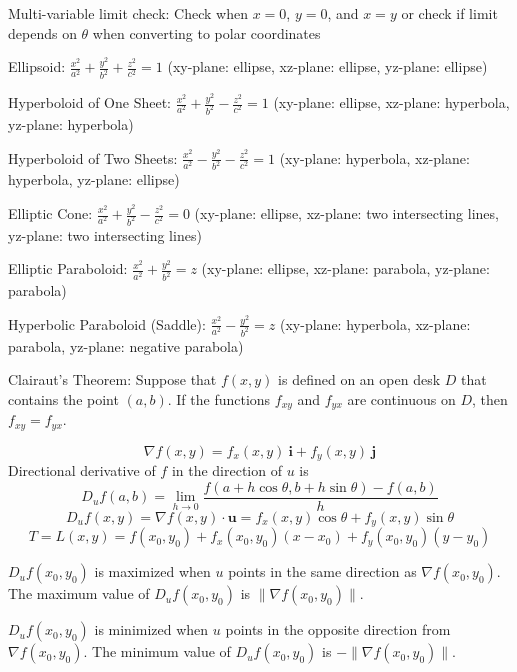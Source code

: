 \documentclass{article}
\begin{document}
Multi-variable limit check: Check when $x=0$, $y=0$, and $x=y$ or check if limit depends on $\theta$ when converting to polar coordinates
\vspace{1em}

Ellipsoid: $\frac{x^2}{a^2} + \frac{y^2}{b^2} + \frac{z^2}{c^2} = 1$ (xy-plane: ellipse, xz-plane: ellipse, yz-plane: ellipse)
\vspace{1em}

Hyperboloid of One Sheet: $\frac{x^2}{a^2} + \frac{y^2}{b^2} - \frac{z^2}{c^2} = 1$ (xy-plane: ellipse, xz-plane: hyperbola, yz-plane: hyperbola)
\vspace{1em}

Hyperboloid of Two Sheets: $\frac{x^2}{a^2} - \frac{y^2}{b^2} - \frac{z^2}{c^2} = 1$ (xy-plane: hyperbola, xz-plane: hyperbola, yz-plane: ellipse)
\vspace{1em}

Elliptic Cone: $\frac{x^2}{a^2} + \frac{y^2}{b^2} - \frac{z^2}{c^2} = 0$ (xy-plane: ellipse, xz-plane: two intersecting lines, yz-plane: two intersecting lines)
\vspace{1em}

Elliptic Paraboloid: $\frac{x^2}{a^2} + \frac{y^2}{b^2} = z$ (xy-plane: ellipse, xz-plane: parabola, yz-plane: parabola)
\vspace{1em}

Hyperbolic Paraboloid (Saddle): $\frac{x^2}{a^2} - \frac{y^2}{b^2} = z$ (xy-plane: hyperbola, xz-plane: parabola, yz-plane: negative parabola)
\vspace{1em}

Clairaut's Theorem: Suppose that $f(x, y)$ is defined on an open desk $D$ that contains the point $(a, b)$. If the functions $f_{xy}$ and $f_{yx}$ are continuous on $D$, then $f_{xy}=f_{yx}$.

\[\nabla f(x,y)=f_x(x,y)\:\mathbf{i}+f_y(x,y)\:\mathbf{j}\]
Directional derivative of $f$ in the direction of $u$ is
\[D_u f(a, b)=\lim_{h\rightarrow 0}\frac{f(a+h\cos\theta, b+h\sin\theta)-f(a,b)}{h}\]
\[D_u f(x, y) = \nabla f(x,y)\cdot\mathbf{u} = f_x(x, y)\cos\theta + f_y(x,y)\sin\theta\]
\[T=L(x,y)=f(x_0,y_0)+f_x(x_0,y_0)(x-x_0)+f_y(x_0,y_0)(y-y_0)\]

$D_u f(x_0, y_0)$ is maximized when $u$ points in the same direction as $\nabla f(x_0, y_0)$. The maximum value of $D_u f(x_0, y_0)$ is $\|\nabla f(x_0, y_0)\|$.
\vspace{0em}

$D_u f(x_0, y_0)$ is minimized when $u$ points in the opposite direction from $\nabla f(x_0, y_0)$. The minimum value of $D_u f(x_0, y_0)$ is $-\|\nabla f(x_0, y_0)\|$.
\vspace{1em}
\end{document}
